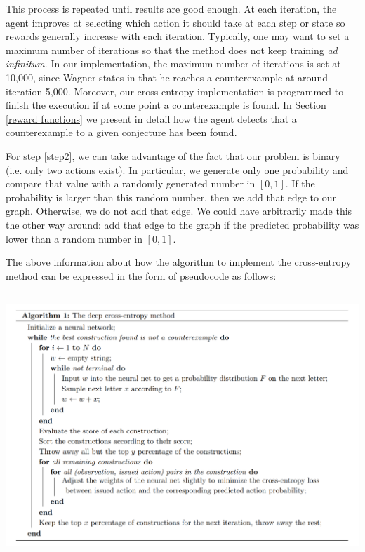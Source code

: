 \documentclass[11pt]{article}
\theoremstyle{definition}
\begin{document}
This process is repeated until results are good enough. At each iteration, the agent improves at selecting which action it should take at each step or state so rewards generally increase with each iteration. Typically, one may want to set a maximum number of iterations so that the method does not keep training \textit{ad infinitum}. In our implementation, the maximum number of iterations is set at 10,000, since Wagner states in \cite{Wagner:2021} that he reaches a counterexample at around iteration 5,000. Moreover, our cross entropy implementation is programmed to finish the execution if at some point a counterexample is found. In Section \ref{reward functions} we present in detail how the agent detects that a counterexample to a given conjecture has been found. 

For step \ref{step2}, we can take advantage of the fact that our problem is binary (i.e. only two actions exist). In particular, we generate only one probability and compare that value with a randomly generated number in $[0, 1]$. If the probability is larger than this random number, then we add that edge to our graph. Otherwise, we do not add that edge. We could have arbitrarily made this the other way around: add that edge to the graph if the predicted probability was lower than a random number in $[0, 1]$. 

The above information about how the algorithm to implement the cross-entropy method can be expressed in the form of pseudocode as follows: 
\begin{center}
    \centering
    \includegraphics[width=\textwidth, height=10cm,  keepaspectratio=true]{images/pseudocode_cross-entropy.png}
    \label{fig:pseudocode_cross-entropy}
\end{center}
\end{document}
